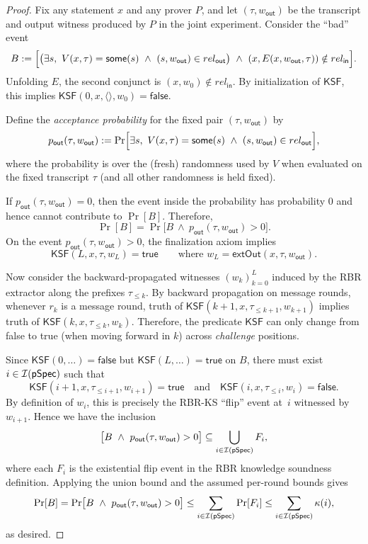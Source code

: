 \begin{proof}
Fix any statement $x$ and any prover $P$, and let $(\tau, w_{\mathsf{out}})$ be the transcript and
output witness produced by $P$ in the joint experiment. Consider the ``bad'' event
\[
  B \defeq
  \Bigl[
    \bigl(\exists s,\ V(x,\tau)=\mathsf{some}(s)\ \wedge\ (s,w_{\mathsf{out}})\in rel_{\mathsf{out}}\bigr)
    \ \wedge\
    (x,E(x,w_{\mathsf{out}},\tau)) \notin rel_{\mathsf{in}}
  \Bigr].
\]
Unfolding $E$, the second conjunct is $(x,w_0)\notin rel_{\mathsf{in}}$. By initialization of
$\mathsf{KSF}$, this implies $\mathsf{KSF}(0,x,\langle\rangle,w_0)=\mathsf{false}$.

Define the \emph{acceptance probability} for the fixed pair $(\tau,w_{\mathsf{out}})$ by
\[
  p_{\mathsf{out}}(\tau,w_{\mathsf{out}})
  \defeq
  \Pr\Bigl[\exists s,\ V(x,\tau) = \mathsf{some}(s)\ \wedge\ (s,w_{\mathsf{out}})\in rel_{\mathsf{out}}\Bigr],
\]
where the probability is over the (fresh) randomness used by $V$ when evaluated on the fixed
transcript $\tau$ (and all other randomness is held fixed).

If $p_{\mathsf{out}}(\tau,w_{\mathsf{out}})=0$, then the event inside the probability has probability
$0$ and hence cannot contribute to $\Pr[B]$. Therefore,
\[
  \Pr[B] = \Pr\bigl[B \ \wedge\ p_{\mathsf{out}}(\tau,w_{\mathsf{out}}) > 0\bigr].
\]
On the event $p_{\mathsf{out}}(\tau,w_{\mathsf{out}}) > 0$, the finalization axiom implies
\[
  \mathsf{KSF}(L,x,\tau,w_L)=\mathsf{true}
  \qquad\text{where } w_L=\mathsf{extOut}(x,\tau,w_{\mathsf{out}}).
\]

Now consider the backward-propagated witnesses $(w_k)_{k=0}^L$ induced by the RBR extractor along the
prefixes $\tau_{\le k}$. By backward propagation on message rounds, whenever $r_k$ is a message
round, truth of $\mathsf{KSF}(k+1,x,\tau_{\le k+1},w_{k+1})$ implies truth of
$\mathsf{KSF}(k,x,\tau_{\le k},w_k)$. Therefore, the predicate $\mathsf{KSF}$ can only change from
false to true (when moving forward in $k$) across \emph{challenge} positions.

Since $\mathsf{KSF}(0,\dots)=\mathsf{false}$ but $\mathsf{KSF}(L,\dots)=\mathsf{true}$ on $B$, there
must exist $i\in\mathcal{I}(\mathsf{pSpec})$ such that
\[
  \mathsf{KSF}(i+1,x,\tau_{\le i+1},w_{i+1})=\mathsf{true}
  \quad\text{and}\quad
  \mathsf{KSF}(i,x,\tau_{\le i},w_i)=\mathsf{false}.
\]
By definition of $w_i$, this is precisely the RBR-KS ``flip'' event at~$i$ witnessed by
$w_{i+1}$. Hence we have the inclusion
\[
  \bigl[B \ \wedge\ p_{\mathsf{out}}(\tau,w_{\mathsf{out}}) > 0\bigr]
  \subseteq \bigcup_{i\in\mathcal{I}(\pSpec)} F_i,
\]
where each $F_i$ is the existential flip event in the RBR knowledge soundness definition. Applying
the union bound and the assumed per-round bounds gives
\[
  \Pr[B]
  = \Pr\bigl[B \ \wedge\ p_{\mathsf{out}}(\tau,w_{\mathsf{out}}) > 0\bigr]
  \le \sum_{i\in\mathcal{I}(\mathsf{pSpec})} \Pr[F_i]
  \le \sum_{i\in\mathcal{I}(\mathsf{pSpec})} \kappa(i),
\]
as desired.
\end{proof}

